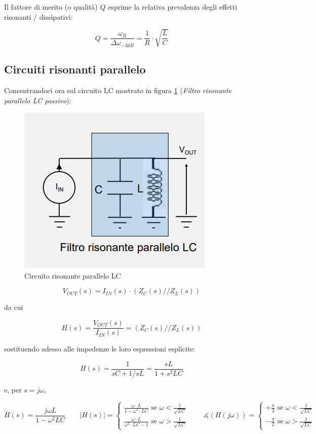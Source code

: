 \documentclass{article}
\begin{document}
Il fattore di merito (o qualità) $Q$ esprime la relativa prevalenza degli effetti risonanti / dissipativi:

\[Q = \frac{\omega _R}{\Delta \omega _{-3dB}} = \frac{1}{R} \cdot \sqrt{\frac{L}{C}}\]











\clearpage
\subsection{Circuiti risonanti parallelo}

Concentrandoci ora sul circuito LC mostrato in figura \ref{Schema_circuito_risonante_parallelo_LC} (\textit{Filtro risonante parallelo LC passivo}):

\begin{figure}[h]
  \centering
  \includegraphics[scale=0.5]{IM_circuito_risonante_parallelo_LC}
  \caption{Circuito risonante parallelo LC}
  \label{Schema_circuito_risonante_parallelo_LC}
\end{figure}

\[V_{OUT}(s) = I_{IN}(s) \cdot (Z_C(s) // Z_L (s))\]

da cui

\[H(s) = \frac{V_{OUT} (s)}{I_{IN} (s)} = (Z_C(s) // Z_L (s))\]

sostituendo adesso alle impedenze le loro espressioni esplicite:

\[H(s) = \frac{1}{sC + 1/sL} = \frac{sL}{1 + s^2 LC}\]

e, per $s = j\omega$, 

\[H(s) = \frac{j \omega L}{1 - \omega ^2 LC} \quad \quad |H(s)| = \begin{cases} \frac{\omega \cdot L}{1 - \omega ^2 \cdot LC} \textrm{ se } \omega < \frac{1}{\sqrt{LC}} \\ \frac{\omega \cdot L}{\omega ^2 \cdot LC - 1} \textrm{ se } \omega > \frac{1}{\sqrt{LC}} \end{cases} \quad \quad \measuredangle (H(j \omega)) = \begin{cases} + \frac{\pi}{2} \textrm{ se } \omega < \frac{1}{\sqrt{LC}} \\ - \frac{\pi}{2} \textrm{ se } \omega > \frac{1}{\sqrt{LC}} \end{cases}\]
\end{document}
